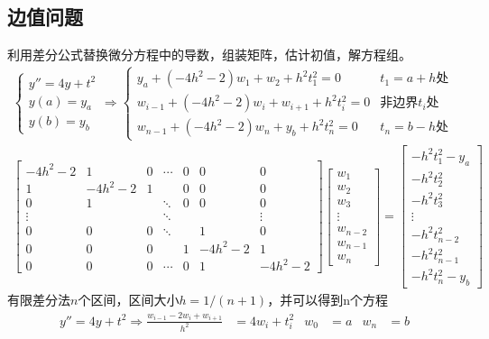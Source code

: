 \documentclass[twocolumn]{article}
\begin{document}
\subsection{边值问题}
利用差分公式替换微分方程中的导数，组装矩阵，估计初值，解方程组。
\begin{align*}
    \begin{cases}
        y''=4y+t^2 \\
        y(a)=y_a   \\
        y(b)=y_b
    \end{cases}
    \Rightarrow
    \begin{cases}
        y_a+(-4h^2-2)w_1+w_2+h^2t_1^2=0         & t_1=a+h\text{处}          \\
        w_{i-1}+(-4h^2-2)w_i+w_{i+1}+h^2t_i^2=0 & \text{非边界}t_i\text{处} \\
        w_{n-1}+(-4h^2-2)w_n+y_b+h^2t_n^2=0     & t_n=b-h\text{处}
    \end{cases} \\
    \begin{bmatrix}
        -4h^2-2 & 1       & 0 & \cdots & 0 & 0       & 0       \\
        1       & -4h^2-2 & 1 &        & 0 & 0       & 0       \\
        0       & 1       &   & \ddots & 0 & 0       & 0       \\
        \vdots  &         &   & \ddots &   &         & \vdots  \\
        0       & 0       & 0 & \ddots &   & 1       & 0       \\
        0       & 0       & 0 &        & 1 & -4h^2-2 & 1       \\
        0       & 0       & 0 & \cdots & 0 & 1       & -4h^2-2
    \end{bmatrix}
    \begin{bmatrix}
        w_1     \\
        w_2     \\
        w_3     \\
        \vdots  \\
        w_{n-2} \\
        w_{n-1} \\
        w_n
    \end{bmatrix}
    =
    \begin{bmatrix}
        -h^2t_1^2-y_a \\
        -h^2t_2^2     \\
        -h^2t_3^2     \\
        \vdots        \\
        -h^2t_{n-2}^2 \\
        -h^2t_{n-1}^2 \\
        -h^2t_n^2-y_b
    \end{bmatrix}
\end{align*}
有限差分法$n$个区间，区间大小$h=1/(n+1)$，并可以得到n个方程
\begin{align*}
    y''=4y+t^2\Rightarrow\frac{w_{i-1}-2w_i+w_{i+1}}{h^2} & =4w_i+t_i^2 & w_0 & =a & w_n & =b
\end{align*}
\end{document}
